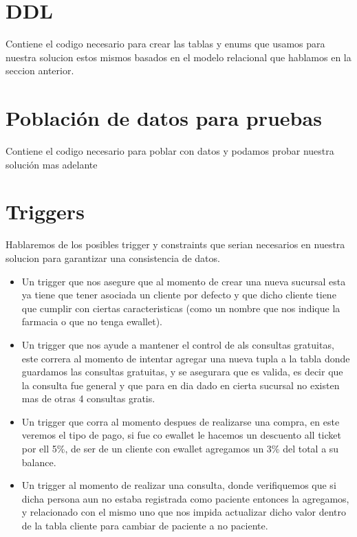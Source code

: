 \documentclass[12pt, fleqn]{report}                             %
\newcommand \Quote              {\qq}                           %
\theoremstyle{break}                                            %
\begin{document}
        \section{DDL}

            Contiene el codigo necesario para crear las tablas y enums que usamos para nuestra solucion estos mismos basados en el modelo
            relacional que hablamos en la seccion anterior.

        \section{Población de datos para pruebas}

            Contiene el codigo necesario para poblar con datos \Quote{dummy} y podamos probar nuestra solución mas adelante

        \section{Triggers}

            Hablaremos de los posibles trigger y constraints que serian necesarios en nuestra solucion para garantizar una consistencia de datos.
            \begin{itemize}
                \item Un trigger que nos asegure que al momento de crear una nueva sucursal esta ya tiene que tener asociada un cliente
                por defecto y que dicho cliente tiene que cumplir con ciertas caracteristicas (como un nombre que nos indique la farmacia o que no tenga
                ewallet).

                \item Un trigger que nos ayude a mantener el control de als consultas gratuitas, este correra al momento de intentar agregar una nueva tupla
                a la tabla donde guardamos las consultas gratuitas, y se asegurara que es valida, es decir que la consulta fue general y que para en dia dado en cierta
                sucursal no existen mas de otras 4 consultas gratis.

                \item Un trigger que corra al momento despues de realizarse una compra, en este veremos el tipo de pago, si fue co ewallet le hacemos un descuento all ticket por
                ell 5\%, de ser de un cliente con ewallet agregamos un 3\% del total a su balance.

                \item Un trigger al momento de realizar una consulta, donde verifiquemos que si dicha persona aun no estaba registrada como paciente entonces
                la agregamos, y relacionado con el mismo uno que nos impida actualizar dicho valor dentro de la tabla cliente para cambiar de paciente a no
                paciente.

            \end{itemize}
\end{document}
